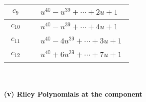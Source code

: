 \documentclass[1p]{elsarticle_modified}
\theoremstyle{definition}
\begin{document}
\begin{tabular}{m{50pt}|m{274pt}}
\hline $$\begin{aligned}c_{9}\end{aligned}$$&$\begin{aligned}
&u^{40}- u^{39}+\cdots+2 u+1
\end{aligned}$\\
\hline $$\begin{aligned}c_{10}\end{aligned}$$&$\begin{aligned}
&u^{40}- u^{39}+\cdots+4 u+1
\end{aligned}$\\
\hline $$\begin{aligned}c_{11}\end{aligned}$$&$\begin{aligned}
&u^{40}-4 u^{39}+\cdots+3 u+1
\end{aligned}$\\
\hline $$\begin{aligned}c_{12}\end{aligned}$$&$\begin{aligned}
&u^{40}+6 u^{39}+\cdots+7 u+1
\end{aligned}$\\
\hline
\end{tabular}\\~\\
\newpage\renewcommand{\arraystretch}{1}
\flushleft \textbf{(v) Riley Polynomials at the component}\newline \\
\end{document}
